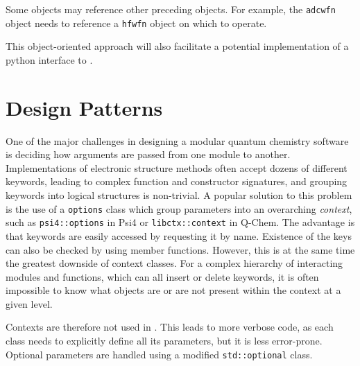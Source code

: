 \noindent Some objects may reference other preceding objects. For example, the \texttt{adcwfn} object needs to reference a \texttt{hfwfn} object on which to operate.

This object-oriented approach will also facilitate a potential implementation of a python interface to \mchem{}.

\section{Design Patterns}

One of the major challenges in designing a modular quantum chemistry software is deciding how arguments are passed from one module to another. Implementations of electronic structure methods often accept dozens of different keywords, leading to complex function and constructor signatures, and grouping keywords into logical structures is non-trivial. A popular solution to this problem is the use of a \texttt{options} class which group parameters into an overarching \emph{context}, such as \texttt{psi4::options} in Psi4 or \texttt{libctx::context} in Q-Chem. The advantage is that keywords are easily accessed by requesting it by name. Existence of the keys can also be checked by using member functions. However, this is at the same time the greatest downside of context classes. For a complex hierarchy of interacting modules and functions, which can all insert or delete keywords, it is often impossible to know what  objects are or are not present within the context at a given level. 

Contexts are therefore not used in \mchem{}. This leads to more verbose code, as each class needs to explicitly define all its parameters, but it is less error-prone. Optional parameters are handled using a modified \texttt{std::optional} class.

